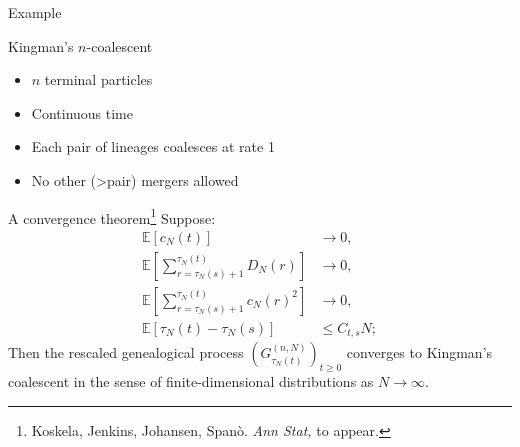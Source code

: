\documentclass[aspectratio=169]{beamer}
\theoremstyle{definition}
\newcommand{\E}{\mathbb{E}}
\begin{document}
\begin{frame}{Example}
\centering
{}
\end{frame}

\begin{frame}{Kingman's $n$-coalescent}
\begin{itemize}
\item $n$ terminal particles
\item Continuous time
\item Each pair of lineages coalesces at rate 1
\item No other (>pair) mergers allowed
\end{itemize}
\end{frame}

\begin{frame}{A convergence theorem\footnote{Koskela, Jenkins, Johansen, Span\`o. \textit{Ann Stat,} to appear.}}
\vspace{-10pt}
Suppose:
\begin{align}
\E [c_N(t)] &\rightarrow 0 , \label{eq:oldass1}\\
\E \left[ \sum_{ r = \tau_N( s ) + 1 }^{ \tau_N( t ) } D_N( r ) \right] &\rightarrow 0, \label{eq:oldass2}\\
\E \left[ \sum_{ r = \tau_N( s ) + 1 }^{ \tau_N( t ) } c_N( r )^2 \right] &\rightarrow 0 , \label{eq:oldass3}\\
\E [\tau_N(t) - \tau_N(s)] &\leq C_{t,s} N; \label{eq:oldass4}
\end{align}
Then the rescaled genealogical process $(G_{\tau_N(t)}^{(n,N)})_{t\geq0} $ converges to Kingman's coalescent in the sense of finite-dimensional distributions as $N\to\infty$.
\end{frame}
\end{document}
